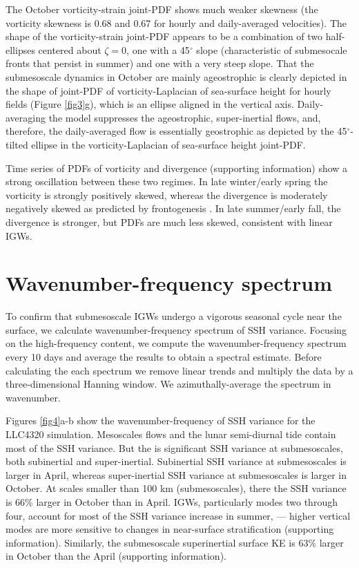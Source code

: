 \documentclass[grl]{agutex2015}
\begin{document}
\begin{article}
The October vorticity-strain joint-PDF shows much weaker skewness (the vorticity skewness
is 0.68 and 0.67 for hourly and daily-averaged velocities). The shape of the
vorticity-strain joint-PDF  appears to be a combination of two half-ellipses centered
about $\zeta=0$, one with a 45$^\circ$ slope (characteristic of submesocale fronts
that persist in summer) and one with a very steep slope.
That the submesoscale dynamics in October are mainly ageostrophic is clearly depicted
in the shape of joint-PDF of vorticity-Laplacian of sea-surface height for hourly fields
 (Figure \ref{fig3}g), which is an ellipse aligned in the vertical axis.
Daily-averaging the model suppresses the ageostrophic, super-inertial flows, and, therefore,
the daily-averaged flow is essentially geostrophic as depicted by the 45$^\circ$-tilted
ellipse in the vorticity-Laplacian of sea-surface height joint-PDF.

 Time series of PDFs of vorticity and divergence (supporting information) show
 a strong oscillation between these two regimes. In late winter/early spring
 the vorticity is strongly positively skewed, whereas the divergence is moderately
 negatively skewed as predicted by frontogenesis \citep[e.g., ][]{mcwilliams2016}
. In late summer/early fall, the divergence is stronger, but PDFs are much less skewed,
consistent with linear IGWs.

\section{Wavenumber-frequency spectrum}
To confirm that submesoscale IGWs undergo a vigorous seasonal cycle near the surface,
we calculate wavenumber-frequency spectrum of SSH variance. Focusing on the high-frequency
content, we compute the wavenumber-frequency spectrum  every 10 days and average
the results to obtain a spectral estimate. Before calculating the each spectrum we
remove linear trends and multiply the data by a three-dimensional Hanning window.
We azimuthally-average the spectrum in wavenumber.

Figures \ref{fig4}a-b show the wavenumber-frequency of SSH variance for the LLC4320
simulation. Mesoscales flows and the lunar semi-diurnal tide contain most of the
SSH variance. But the is significant SSH variance at submesoscales, both subinertial
and super-inertial. Subinertial SSH variance at submesoscales is larger in April, whereas
super-inertial SSH variance at submesoscales is larger in October. At scales smaller
than 100 km (submesoscales), there the SSH variance is 66$\%$ larger in October than in April.
IGWs, particularly modes two through four, account for most of the SSH variance
increase in summer, --- higher vertical
modes are more sensitive to changes in near-surface stratification (supporting information).
Similarly, the submesoscale superinertial surface KE is 63$\%$ larger in October
than the April (supporting information).


\end{article}
\end{document}
